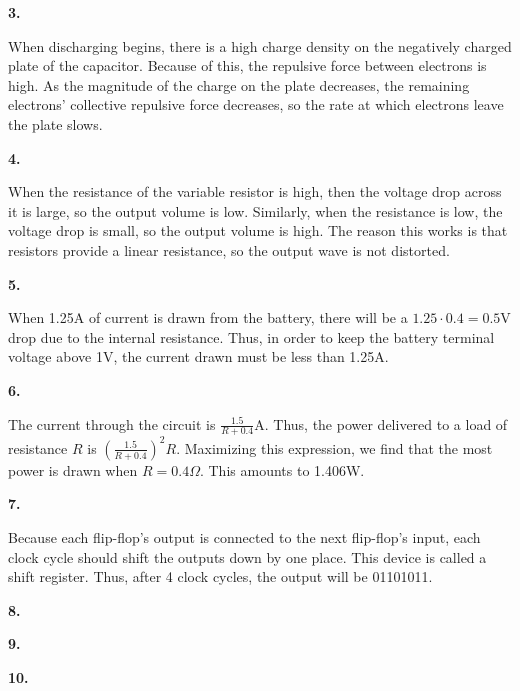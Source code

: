 \documentclass{article}
\begin{document}
\newpage\noindent\textbf{3.}

    When discharging begins, there is a high charge density on the negatively charged plate of the capacitor.
    Because of this, the repulsive force between electrons is high.
    As the magnitude of the charge on the plate decreases, the remaining electrons' collective repulsive force decreases, so the rate at which electrons leave the plate slows.

\newpage\noindent\textbf{4.}

    When the resistance of the variable resistor is high, then the voltage drop across it is large, so the output volume is low.
    Similarly, when the resistance is low, the voltage drop is small, so the output volume is high.
    The reason this works is that resistors provide a linear resistance, so the output wave is not distorted.

\newpage\noindent\textbf{5.}

    When 1.25A of current is drawn from the battery, there will be a $1.25 \cdot 0.4 = 0.5$V drop due to the internal resistance. Thus, in order to keep the battery terminal voltage above 1V, the current drawn must be less than 1.25A.

\newpage\noindent\textbf{6.}

    The current through the circuit is $\frac{1.5}{R + 0.4}$A.
    Thus, the power delivered to a load of resistance $R$ is $\left(\frac{1.5}{R+0.4}\right)^2R$.
    Maximizing this expression, we find that the most power is drawn when $R=0.4\Omega$.
    This amounts to 1.406W.

\newpage\noindent\textbf{7.}

    Because each flip-flop's output is connected to the next flip-flop's input, each clock cycle should shift the outputs down by one place.
    This device is called a shift register.
    Thus, after 4 clock cycles, the output will be 01101011.
    
\newpage\noindent\textbf{8.}

\newpage\noindent\textbf{9.}

\newpage\noindent\textbf{10.}
\end{document}
